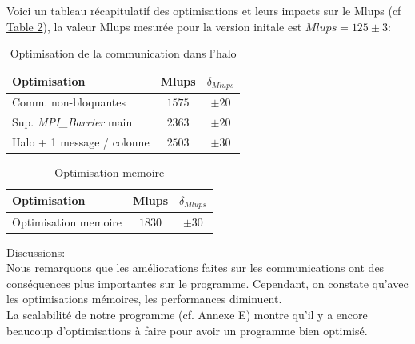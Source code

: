 
Voici un tableau récapitulatif des optimisations et leurs impacts sur le Mlups (cf \hyperref[tab:results_halo]{Table 2}), la valeur Mlups mesurée pour la version initale est $Mlups=125\pm3$:

\begin{table}[H]
  \centering
  \caption{Optimisation de la communication dans l'halo}
  \label{tab:results_halo}
  \begin{tabular}{lcc}
    \toprule
    \textbf{Optimisation} & \textbf{Mlups} & $\delta_{Mlups}$ \\
    \midrule
     Comm. non-bloquantes  & $1575$ & $\pm 20$\\
     Sup. \textit{MPI\_Barrier} main  & $2363$ & $\pm 20$\\
     Halo + 1 message / colonne  & $2503$ & $\pm 30$\\
    \bottomrule
  \end{tabular}
\end{table}

\begin{table}[H]
  \centering
  \caption{Optimisation memoire}
  \label{tab:results_memory}
  \begin{tabular}{lcc}
    \toprule
    \textbf{Optimisation} & \textbf{Mlups} & $\delta_{Mlups}$ \\
    \midrule
     Optimisation memoire  & $1830$ & $\pm 30$\\
    \bottomrule
  \end{tabular}
\end{table}


Discussions:\\
Nous remarquons que les améliorations faites sur les communications ont des conséquences plus importantes sur le programme. Cependant, on constate qu'avec les optimisations mémoires, les performances diminuent.\\

La scalabilité de notre programme (cf. Annexe E) montre qu'il y a encore beaucoup d'optimisations à faire pour avoir un programme bien optimisé.\\
